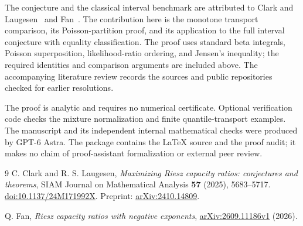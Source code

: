 \documentclass[11pt]{article}
\theoremstyle{remark}
\begin{document}
The conjecture and the classical interval benchmark are attributed to
Clark and Laugesen~\cite{CL} and Fan~\cite{Fan}. The contribution here
is the monotone transport comparison, its Poisson-partition proof, and
its application to the full interval conjecture with equality
classification. The proof uses standard beta integrals, Poisson
superposition, likelihood-ratio ordering, and Jensen's inequality;
the required identities and comparison arguments are included above.
The accompanying literature review records the sources and public
repositories checked for earlier resolutions.

The proof is analytic and requires no numerical certificate. Optional
verification code checks the mixture normalization and finite
quantile-transport examples. The manuscript and its independent internal
mathematical checks were produced by GPT-6 Astra. The package contains
the LaTeX source and the proof audit; it makes no claim of proof-assistant
formalization or external peer review.

\begin{thebibliography}{9}
C. Clark and R. S. Laugesen,
\emph{Maximizing Riesz capacity ratios: conjectures and theorems},
SIAM Journal on Mathematical Analysis \textbf{57} (2025), 5683--5717.
\href{https://doi.org/10.1137/24M171992X}{doi:10.1137/24M171992X}.
Preprint: \href{https://arxiv.org/abs/2410.14809}{arXiv:2410.14809}.

Q. Fan,
\emph{Riesz capacity ratios with negative exponents},
\href{https://arxiv.org/abs/2609.11186v1}{arXiv:2609.11186v1} (2026).
\end{thebibliography}
\end{document}
